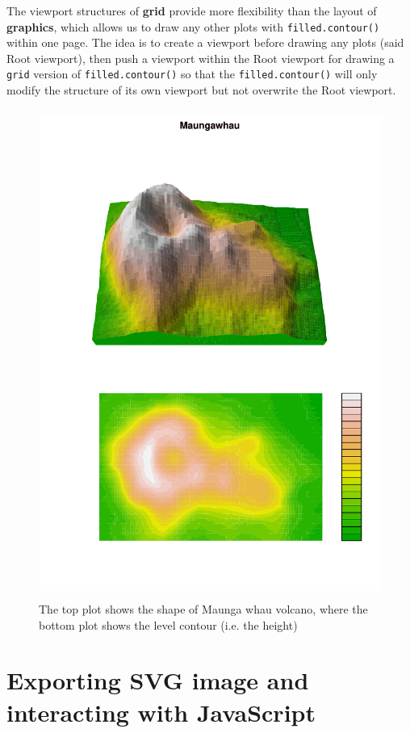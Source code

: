 \documentclass[11pt,twoside]{report}
\begin{document}
The viewport structures of \textbf{grid} provide more flexibility than the layout of \textbf{graphics}, which allows us to draw any other plots with \texttt{filled.contour()} within one page. The idea is to create a viewport before drawing any plots (said Root viewport), then push a viewport within the Root viewport for drawing a \texttt{grid} version of \texttt{filled.contour()} so that the \texttt{filled.contour()} will only modify the structure of its own viewport but not overwrite the Root viewport.\\
\begin{figure}[H]
	\begin{center}
		\includegraphics[height = 16cm, width = 12cm]{figure/Chapter6_example_3_1.pdf}
		\caption{The top plot shows the shape of Maunga whau volcano, where the bottom plot shows the level contour (i.e. the height)}
		\label{Example_6.2.1}
	\end{center}
\end{figure}


\newpage
\section{Exporting SVG image and interacting with JavaScript}
\end{document}
